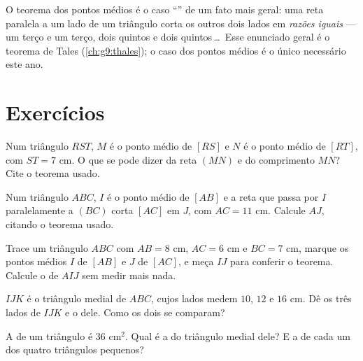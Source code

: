 \begin{remark}
O teorema dos pontos médios é o caso ``'' de um fato mais geral:
uma reta paralela a um lado de um triângulo corta os outros dois lados
em \emph{razões iguais} --- um terço e um terço, dois quintos e dois
quintos\,\dots\ Esse enunciado geral é o teorema de Tales
(\cref{ch:g9:thales}); o caso dos pontos médios é o único necessário
este ano.
\end{remark}

\section{Exercícios}

\begin{exercise}[$\star$]\label{exo:g8:midpoints:1}
Num triângulo $RST$, $M$ é o ponto médio de $[RS]$ e $N$ é o ponto
médio de $[RT]$, com $ST = 7$ cm. O que se pode dizer da reta $(MN)$ e
do comprimento $MN$? Cite o teorema usado.
\end{exercise}

\begin{exercise}[$\star$]\label{exo:g8:midpoints:2}
Num triângulo $ABC$, $I$ é o ponto médio de $[AB]$ e a reta que passa
por $I$ paralelamente a $(BC)$ corta $[AC]$ em $J$, com $AC = 11$ cm.
Calcule $AJ$, citando o teorema usado.
\end{exercise}

\begin{exercise}[$\star$]\label{exo:g8:midpoints:3}
Trace um triângulo $ABC$ com $AB = 8$ cm, $AC = 6$ cm e $BC = 7$ cm,
marque os pontos médios $I$ de $[AB]$ e $J$ de $[AC]$, e meça $IJ$ para
conferir o teorema. Calcule o  de $AIJ$ sem medir mais nada.
\end{exercise}

\begin{exercise}[$\star$]\label{exo:g8:midpoints:4}
$IJK$ é o triângulo medial de $ABC$, cujos lados medem $10$, $12$ e
$16$ cm. Dê os três lados de $IJK$ e o  dele. Como os dois
 se comparam?
\end{exercise}

\begin{exercise}[$\star$]\label{exo:g8:midpoints:5}
A  de um triângulo é $36$ cm$^2$. Qual é a  do triângulo medial
dele? E a de cada um dos quatro triângulos pequenos?
\end{exercise}

